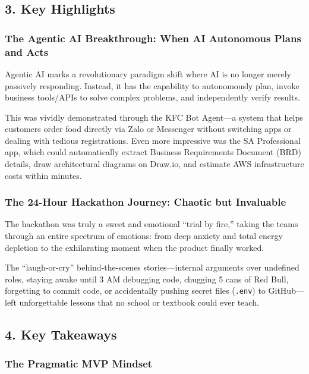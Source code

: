 \hypertarget{key-highlights}{%
\subsection{3. Key Highlights}}

\hypertarget{the-agentic-ai-breakthrough-when-ai-autonomous-plans-and-acts}{%
\subsubsection{The Agentic AI Breakthrough: When AI Autonomous Plans and
Acts}}

Agentic AI marks a revolutionary paradigm shift where AI is no longer
merely passively responding. Instead, it has the capability to
autonomously plan, invoke business tools/APIs to solve complex problems,
and independently verify results.

This was vividly demonstrated through the KFC Bot Agent---a system that
helps customers order food directly via Zalo or Messenger without
switching apps or dealing with tedious registrations. Even more
impressive was the SA Professional app, which could automatically
extract Business Requirements Document (BRD) details, draw architectural
diagrams on Draw.io, and estimate AWS infrastructure costs within
minutes.

\hypertarget{the-24-hour-hackathon-journey-chaotic-but-invaluable}{%
\subsubsection{The 24-Hour Hackathon Journey: Chaotic but
Invaluable}}

The hackathon was truly a sweet and emotional ``trial by fire,'' taking
the teams through an entire spectrum of emotions: from deep anxiety and
total energy depletion to the exhilarating moment when the product
finally worked.

The ``laugh-or-cry'' behind-the-scenes stories---internal arguments over
undefined roles, staying awake until 3 AM debugging code, chugging 5
cans of Red Bull, forgetting to commit code, or accidentally pushing
secret files (\texttt{.env}) to GitHub---left unforgettable lessons that
no school or textbook could ever teach.

\hypertarget{key-takeaways}{%
\subsection{4. Key Takeaways}}

\hypertarget{the-pragmatic-mvp-mindset}{%
\subsubsection{The Pragmatic MVP
Mindset}}

